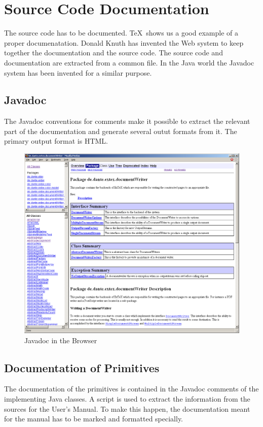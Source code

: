 \chapter{Source Code Documentation}


The source code has to be documented. \TeX\ shows us a good example of
a proper documenatation. Donald Knuth has invented the Web system to
keep together the documentation and the source code. The source code
and documentation are extracted from a common file. In the Java world
the Javadoc system has been invented for a similar purpose. 

\section{Javadoc}

The Javadoc conventions for comments make it possible to extract the
relevant part of the documentation and generate several outut formats
from it. The primary output format is HTML.
\begin{figure}[tbh]
  \centering
  \includegraphics[scale=.33]{image/javadoc}
  \caption{Javadoc in the Browser}\label{fig:eclipse-javadoc}
\end{figure}

\section{Documentation of Primitives}

The documentation of the primitives is contained in the Javadoc
comments of the implementing Java classes. A script is used to extract
the information from the sources for the User's Manual. To make this
happen, the documentation meant for the manual has to be marked and
formatted specially.

\INCOMPLETE


